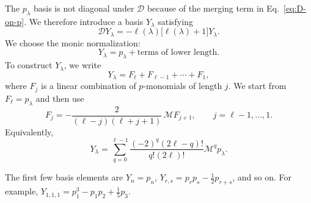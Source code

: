 \documentclass[9pt,twocolumn,twoside]{gsajnl}
\newcommand{\Dop}{\mathcal D}
\newcommand{\Mop}{\mathcal M}
\begin{document}
The $p_\lambda$ basis is not diagonal under $\Dop$ because of the merging term in Eq.~\eqref{eq:D-on-p}.  We therefore introduce a basis $Y_\lambda$ satisfying
\begin{equation}
\Dop Y_\lambda
=
-\ell(\lambda)\bigl[\ell(\lambda)+1\bigr]Y_\lambda.
\label{eq:Y-eigen}
\end{equation}
We choose the monic normalization: %
\begin{equation}
Y_\lambda=p_\lambda+\text{terms of lower length}.
\label{eq:Y-monic}
\end{equation}
To construct $Y_\lambda$, we write 
\begin{equation}
Y_\lambda=F_\ell+F_{\ell-1}+\cdots+F_1,
\label{eq:Y-F-decomp}
\end{equation}
where $F_j$ is a linear combination of $p$-monomials of length $j$.  We start from $F_\ell=p_\lambda$ and then use
\begin{equation}
F_j=
-\frac{2}{(\ell-j)(\ell+j+1)}\,
\Mop F_{j+1},
\qquad
j=\ell-1,\ldots,1.
\label{eq:F-recursion}
\end{equation}
Equivalently,
\begin{equation}
Y_\lambda
=
\sum_{q=0}^{\ell-1}
\frac{(-2)^q(2\ell-q)!}{q!(2\ell)!}
\Mop^q p_\lambda.
\label{eq:Y-closed}
\end{equation}

The first few basis elements are $Y_{n}=p_n$, $Y_{r,s}=p_rp_s-\frac12p_{r+s}$, and so on.
For example, $Y_{1,1,1} = p_1^3-p_1p_2+\frac15p_3$.
\end{document}
